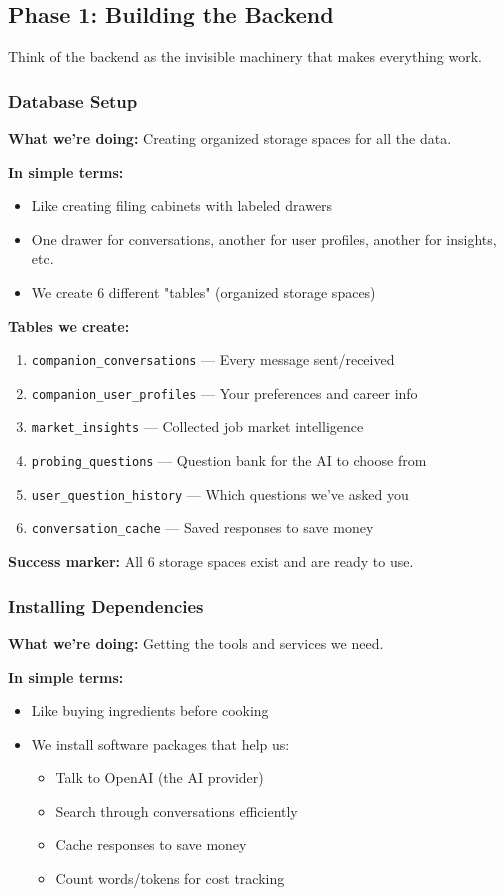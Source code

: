 \documentclass[12pt,a4paper]{article}
\begin{document}
\subsection{Phase 1: Building the Backend}

Think of the backend as the invisible machinery that makes everything work.

\subsubsection{Database Setup }

\textbf{What we're doing:} Creating organized storage spaces for all the data.

\textbf{In simple terms:}
\begin{itemize}
  \item Like creating filing cabinets with labeled drawers
  \item One drawer for conversations, another for user profiles, another for insights, etc.
  \item We create 6 different "tables" (organized storage spaces)
\end{itemize}

\textbf{Tables we create:}
\begin{enumerate}
  \item \texttt{companion\_conversations} — Every message sent/received
  \item \texttt{companion\_user\_profiles} — Your preferences and career info
  \item \texttt{market\_insights} — Collected job market intelligence
  \item \texttt{probing\_questions} — Question bank for the AI to choose from
  \item \texttt{user\_question\_history} — Which questions we've asked you
  \item \texttt{conversation\_cache} — Saved responses to save money
\end{enumerate}

\textbf{Success marker:} All 6 storage spaces exist and are ready to use.

\subsubsection{Installing Dependencies }

\textbf{What we're doing:} Getting the tools and services we need.

\textbf{In simple terms:}
\begin{itemize}
  \item Like buying ingredients before cooking
  \item We install software packages that help us:
    \begin{itemize}
      \item Talk to OpenAI (the AI provider)
      \item Search through conversations efficiently
      \item Cache responses to save money
      \item Count words/tokens for cost tracking
    \end{itemize}
\end{itemize}
\end{document}
